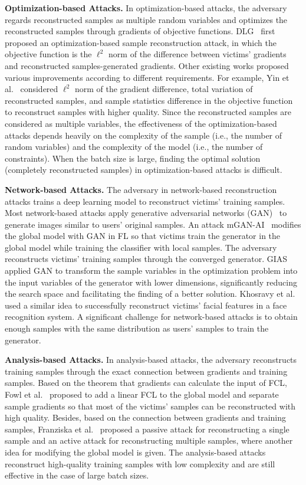 \textbf{Optimization-based Attacks.}
In optimization-based attacks, the adversary regards reconstructed samples as multiple random variables and optimizes the reconstructed samples through gradients of objective functions. DLG~\cite{Zhu2020DLG} first proposed an optimization-based sample reconstruction attack, in which the objective function is the $\ell^2$ norm of the difference between victims' gradients and reconstructed samples-generated gradients. Other existing works proposed various improvements according to different requirements. For example, Yin et al.~\cite{Yin2021see} considered $\ell^2$ norm of the gradient difference, total variation of reconstructed samples, and sample statistics difference in the objective function to reconstruct samples with higher quality. Since the reconstructed samples are considered as multiple variables, the effectiveness of the optimization-based attacks depends heavily on the complexity of the sample (i.e., the number of random variables) and the complexity of the model (i.e., the number of constraints). When the batch size is large, finding the optimal solution (completely reconstructed samples) in optimization-based attacks is difficult.

\textbf{Network-based Attacks.}
The adversary in network-based reconstruction attacks trains a deep learning model to reconstruct victims' training samples. Most network-based attacks apply generative adversarial networks (GAN)~\cite{goodfellow2014GAN} to generate images similar to users' original samples. An attack mGAN-AI~\cite{Song2020Analyzing} modifies the global model with GAN in FL so that victims train the generator in the global model while training the classifier with local samples. The adversary reconstructs victims' training samples through the converged generator. GIAS~\cite{jeon2021gradient} applied GAN to transform the sample variables in the optimization problem into the input variables of the generator with lower dimensions, significantly reducing the search space and facilitating the finding of a better solution. Khosravy et al.~\cite{Khosravy2022Model} used a similar idea to successfully reconstruct victims' facial features in a face recognition system. A significant challenge for network-based attacks is to obtain enough samples with the same distribution as users' samples to train the generator.

\textbf{Analysis-based Attacks.} In analysis-based attacks, the adversary reconstructs training samples through the exact connection between gradients and training samples. Based on the theorem that gradients can calculate the input of FCL, Fowl et al.~\cite{fowl2022robbing} proposed to add a linear FCL to the global model and separate sample gradients so that most of the victims' samples can be reconstructed with high quality. Besides, based on the connection between gradients and training samples, Franziska et al.~\cite{Boenisch2021When} proposed a passive attack for reconstructing a single sample and an active attack for reconstructing multiple samples, where another idea for modifying the global model is given. The analysis-based attacks reconstruct high-quality training samples with low complexity and are still effective in the case of large batch sizes.

